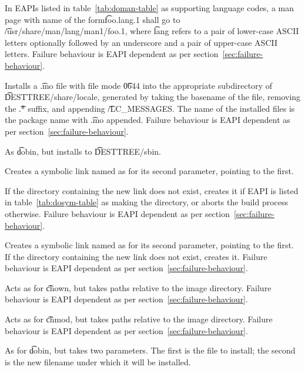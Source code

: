 \begin{description}
     In EAPIs listed in table~\ref{tab:doman-table} as supporting language
    codes, a man page with name of the form\t{foo.lang.1} shall go to
    \t{/usr/share/man/lang/man1/foo.1}, where \t{lang} refers to a pair of lower-case ASCII letters
    optionally followed by an underscore and a pair of upper-case ASCII letters. Failure behaviour
    is EAPI dependent as per section~\ref{sec:failure-behaviour}.

\item[domo] Installs a \t{.mo} file with file mode \t{0644} into the appropriate subdirectory of
    \t{DESTTREE/share/locale}, generated by taking the basename of the file, removing the \t{.*}
    suffix, and appending \t{/LC\_MESSAGES}. The name of the installed files is the package name
    with \t{.mo} appended. Failure behaviour is EAPI dependent as per section~\ref{sec:failure-behaviour}.

\item[dosbin] As \t{dobin}, but installs to \t{DESTTREE/sbin}.

\IFKDEBUILDELSE
{
    \item[dosym] Creates a symbolic link named as for its second parameter, pointing to the first.

         If the directory containing the new link does not exist, creates
        it if EAPI is listed in table~\ref{tab:dosym-table} as making the directory, or aborts the
        build process otherwise.  Failure behaviour is EAPI dependent as per
        section~\ref{sec:failure-behaviour}.
}{
    \item[dosym] Creates a symbolic link named as for its second parameter, pointing to the first. If
        the directory containing the new link does not exist, creates it. Failure behaviour is EAPI
        dependent as per section~\ref{sec:failure-behaviour}.
}

\item[fowners] Acts as for \t{chown}, but takes paths relative to the image directory. Failure
    behaviour is EAPI dependent as per section~\ref{sec:failure-behaviour}.

\item[fperms] Acts as for \t{chmod}, but takes paths relative to the image directory. Failure
    behaviour is EAPI dependent as per section~\ref{sec:failure-behaviour}.

\item[newbin] As for \t{dobin}, but takes two parameters. The first is the file to install; the
    second is the new filename under which it will be installed.


\end{description}
